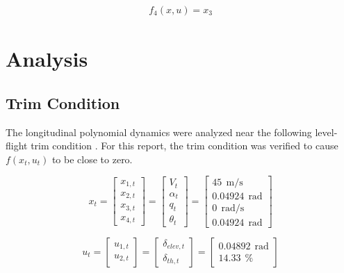 \documentclass[%
 reprint,
 amsmath,amssymb,
 aps,
]{revtex4-2}
\begin{document}
\begin{align*}
    f_4(x,u) = x_3 \tag{27}
\end{align*}

\newpage
\section{Analysis}

\subsection{Trim Condition}

The longitudinal polynomial dynamics were analyzed near the following level-flight trim condition \cite{primary}. For this report, the trim condition was verified to cause $f(x_t,u_t)$ to be close to zero. 

\begin{equation*}
    x_t = 
        \begin{bmatrix} 
            x_{1,t} \\ x_{2,t} \\ x_{3,t} \\ x_{4,t} 
        \end{bmatrix} = 
        \begin{bmatrix} 
            V_t \\ \alpha_t \\ q_t \\ \theta_t 
        \end{bmatrix} = 
        \begin{bmatrix}
            45\ \  \text{m/s} \\
            0.04924\ \  \text{rad} \\
            0\ \  \text{rad/s} \\
            0.04924\ \  \text{rad}
        \end{bmatrix} \tag{27}
\end{equation*}

\begin{equation*}
        u_t = 
        \begin{bmatrix}
            u_{1,t} \\ u_{2,t}
        \end{bmatrix} = 
        \begin{bmatrix}
            \delta_{elev,t} \\
            \delta_{th,t}
        \end{bmatrix} = 
        \begin{bmatrix}
            0.04892\ \  \text{rad} \\
            14.33\ \  \text{\%}
        \end{bmatrix} \tag{28}
\end{equation*}
\end{document}
